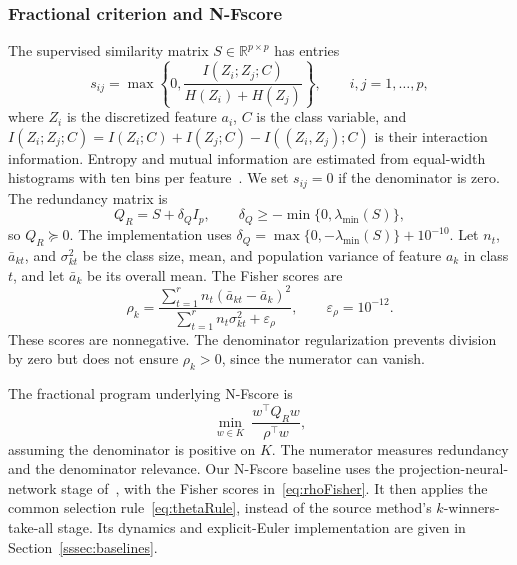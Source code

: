 \documentclass[]{interact}
\theoremstyle{plain}
\theoremstyle{definition}
\theoremstyle{remark}
\newcommand{\R}{\mathbb{R}}
\begin{document}
\subsubsection{Fractional criterion and N-Fscore}\label{ssec:wang}\label{sssec:wang-inputs}\label{sssec:nfscore}
The supervised similarity matrix $S\in\R^{p\times p}$ has entries
\begin{equation}\label{eq:simMI}
s_{ij}=\max\left\{0,\frac{I(Z_i;Z_j;C)}{H(Z_i)+H(Z_j)}\right\},\qquad i,j=1,\ldots,p,
\end{equation}
where $Z_i$ is the discretized feature $a_i$, $C$ is the class variable, and $I(Z_i;Z_j;C)=I(Z_i;C)+I(Z_j;C)-I((Z_i,Z_j);C)$ is their interaction information. Entropy and mutual information are estimated from equal-width histograms with ten bins per feature~\citep{brown2012}. We set $s_{ij}=0$ if the denominator is zero. The redundancy matrix is
\begin{equation}\label{eq:matrixQ}
Q_R=S+\delta_QI_p,\qquad \delta_Q\ge-\min\{0,\lambda_{\min}(S)\},
\end{equation}
so $Q_R\succeq0$. The implementation uses $\delta_Q=\max\{0,-\lambda_{\min}(S)\}+10^{-10}$. Let $n_t$, $\bar a_{kt}$, and $\sigma_{kt}^2$ be the class size, mean, and population variance of feature $a_k$ in class $t$, and let $\bar a_k$ be its overall mean. The Fisher scores are
\begin{equation}\label{eq:rhoFisher}
\rho_k=\frac{\sum_{t=1}^r n_t(\bar a_{kt}-\bar a_k)^2}{\sum_{t=1}^r n_t\sigma_{kt}^2+\varepsilon_\rho},\qquad \varepsilon_\rho=10^{-12}.
\end{equation}
These scores are nonnegative. The denominator regularization prevents division by zero but does not ensure $\rho_k>0$, since the numerator can vanish.

The fractional program underlying N-Fscore is
\begin{equation}\label{eq:wangOrig}
\min_{w\in K}\ \frac{w^{\top}Q_Rw}{\rho^{\top}w},
\end{equation}
assuming the denominator is positive on $K$. The numerator measures redundancy and the denominator relevance. Our N-Fscore baseline uses the projection-neural-network stage of~\citep{wang2021fractional}, with the Fisher scores in~\eqref{eq:rhoFisher}. It then applies the common selection rule~\eqref{eq:thetaRule}, instead of the source method's $k$-winners-take-all stage. Its dynamics and explicit-Euler implementation are given in Section~\ref{sssec:baselines}.
\end{document}
